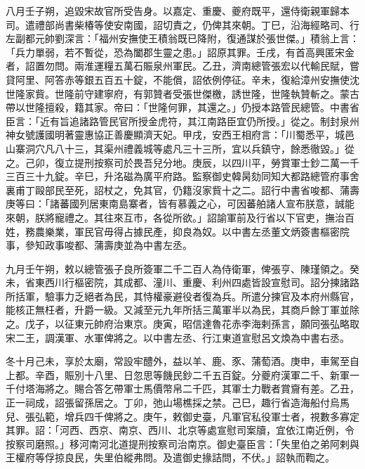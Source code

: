 \begin{pinyinscope}
 八月壬子朔，追毀宋故官所受告身。以嘉定、重慶、夔府既平，還侍衛親軍歸本司。遣禮部尚書柴椿等使安南國，詔切責之，仍俾其來朝。丁巳，沿海經略司、行左副都元帥劉深言：「福州安撫使王積翁既已降附，復通謀於張世傑。」積翁上言：「兵力單弱，若不暫從，恐為闔郡生靈之患。」詔原其罪。壬戌，有首高興匿宋金者，詔置勿問。兩淮運糧五萬石賑泉州軍民。乙丑，濟南總管張宏以代輸民賦，嘗貸阿里、阿答赤等銀五百五十錠，不能償，詔依例停征。辛未，復給漳州安撫使沈世隆家貲。世隆前守建寧府，有郭贊者受張世傑檄，誘世隆，世隆執贊斬之。蒙古帶以世隆擅殺，籍其家。帝曰：「世隆何罪，其還之。」仍授本路管民總管。中書省臣言：「近有旨追諸路管民官所授金虎符，其江南路臣宜仍所授。」從之。制封泉州神女號護國明著靈惠協正善慶顯濟天妃。甲戌，安西王相府言：「川蜀悉平，城邑山寨洞穴凡八十三，其渠州禮義城等處凡三十三所，宜以兵鎮守，餘悉徹毀。」從之。己卯，復立提刑按察司於畏吾兒分地。庚辰，以四川平，勞賞軍士鈔二萬一千三百三十九錠。辛巳，升洺磁為廣平府路。監察御史韓昺劾同知大都路總管府事舍裏甫丁毆部民至死，詔杖之，免其官，仍籍沒家貲十之二。詔行中書省唆都、蒲壽庚等曰：「諸蕃國列居東南島寨者，皆有慕義之心，可因蕃舶諸人宣布朕意，誠能來朝，朕將寵禮之。其往來互市，各從所欲。」詔諭軍前及行省以下官吏，撫治百姓，務農樂業，軍民官毋得占據民產，抑良為奴。以中書左丞董文炳簽書樞密院事，參知政事唆都、蒲壽庚並為中書左丞。



 九月壬午朔，敕以總管張子良所簽軍二千二百人為侍衛軍，俾張亨、陳瑾領之。癸未，省東西川行樞密院，其成都、潼川、重慶、利州四處皆設宣慰司。詔分揀諸路所括軍，驗事力乏絕者為民，其恃權豪避役者復為兵。所遣分揀官及本府州縣官，能核正無枉者，升爵一級。又減至元九年所括三萬軍半以為民，其商戶餘丁軍並除之。戊子，以征東元帥府治東京。庚寅，昭信達魯花赤李海剌孫言，願同張弘略取宋二王，調漢軍、水軍俾將之。以中書左丞、行江東道宣慰呂文煥為中書右丞。



 冬十月己未，享於太廟，常設牢醴外，益以羊、鹿、豕、蒲萄酒。庚申，車駕至自上都。辛酉，賑別十八里、日忽思等饑民鈔二千五百錠。分夔府漢軍二千、新軍一千付塔海將之。賜合答乞帶軍士馬價幣帛二千匹，其軍士力戰者賞齎有差。乙丑，正一祠成，詔張留孫居之。丁卯，弛山場樵採之禁。己巳，趣行省造海船付烏馬兒、張弘範，增兵四千俾將之。庚午，敕御史臺，凡軍官私役軍士者，視數多寡定其罪。詔：「河西、西京、南京、西川、北京等處宣慰司案牘，宜依江南近例，令按察司磨照。」移河南河北道提刑按察司治南京。御史臺臣言：「失里伯之弟阿剌與王權府等俘掠良民，失里伯縱弗問。及遣御史掾詰問，不伏。」詔執而鞫之。




\end{pinyinscope}

